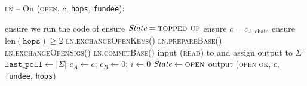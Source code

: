 \begin{center}
  \begin{processbox}{\textsc{ln} -- On (\textsc{open}, $c$, \texttt{hops},
  \texttt{fundee}):}
    \begin{algorithmic}[1]
      \State {}
      \label{code:ln:open:alice-open}
      \State ensure we run the code of \alice{} 
       
        \State ensure $\itistate = \textsc{topped up}$
        \State ensure $c = c_{A, \mathrm{chain}}$
      \Else \: 
        \State ensure $\mathrm{len}(\texttt{hops}) \geq 2$ 
      \EndIf
      \State \textsc{ln.exchangeOpenKeys}()
      \State \textsc{ln.prepareBase}()
      \State \textsc{ln.exchangeOpenSigs}()
        \State \textsc{ln.commitBase}()
      \EndIf
      \State input (\textsc{read}) to \ledger and assign output to $\Sigma$
      \State $\texttt{last\_poll} \gets |\Sigma|$
      \State $c_A \gets c$; $c_B \gets 0$; $i \gets 0$
      \State $\itistate \gets \textsc{open}$
      \label{code:ln:open:state-open}
      \State output (\textsc{open ok}, $c$, \texttt{fundee}, \texttt{hops})
    \end{algorithmic}
  \end{processbox}
  \label{code:ln:open}
\end{center} \ \\

